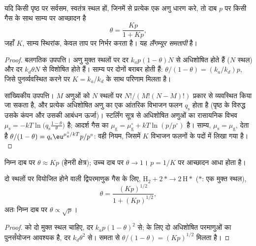 \begin{theorem}[लैंगम्यूर समतापी]\label{thm:b3:surfaces-catalysis:langmuir}
यदि किसी पृष्ठ पर सर्वसम, स्वतंत्र स्थल हों, जिनमें से प्रत्येक एक अणु धारण करे, तो
दाब $p$ पर किसी गैस के साथ साम्य पर आच्छादन है
\[
  \theta = \frac{Kp}{1 + Kp},
\]
जहाँ $K$,  साम्य स्थिरांक, केवल
ताप पर निर्भर करता है। यह \emph{लैंगम्यूर समतापी} है।
\end{theorem}

\begin{proof}
बलगतिक उपपत्ति। अणु मुक्त स्थलों पर दर $k_ap(1 - \theta)N$ से अधिशोषित होते हैं ($N$
स्थल) और दर $k_d\theta N$ से विशोषित होते हैं। साम्य पर दोनों बराबर होती हैं: $\theta/(1 - \theta)
= (k_a/k_d)p$, जिसे पुनर्व्यवस्थित करने पर $K = k_a/k_d$ के साथ परिणाम मिलता है।

सांख्यिकीय उपपत्ति। $M$ अणुओं को $N$ स्थलों पर $N!/(M!(N - M)!)$ प्रकार से व्यवस्थित किया जा सकता है,
और प्रत्येक अधिशोषित अणु का एक आंतरिक विभाजन फलन $q_{\mathrm s}$ होता है (पृष्ठ के
विरुद्ध उसके कंपन और उसकी आबंधन ऊर्जा)। स्टर्लिंग सूत्र से
अधिशोषित अणुओं का रासायनिक विभव $\mu_{\mathrm s} = -kT\ln\bigl(q_{\mathrm s}\frac{1 - \theta}{\theta}\bigr)$ है;
आदर्श गैस का $\mu_{\mathrm g} = \mu_{\mathrm g}^\circ + kT\ln(p/p^\circ)$ है। साम्य, $\mu_{\mathrm s} = \mu_{\mathrm g}$, देता है
$\theta/(1 - \theta) = q_{\mathrm s}\eu^{\mu_{\mathrm g}^\circ/kT}p/p^\circ$: वही नियम, जिसमें $K$ विभाजन फलनों के
पदों में लिखा गया है।
\end{proof}

निम्न दाब पर $\theta \approx Kp$ (हेनरी क्षेत्र); उच्च दाब पर $\theta \to 1$।
$p = 1/K$ पर आच्छादन आधा होता है।

\begin{proposition}[वियोजी अधिशोषण]\label{prop:b3:surfaces-catalysis:dissociative}
दो स्थलों पर वियोजित होने वाली द्विपरमाणुक गैस के लिए, $\mathrm{H_2} + 2\,{*} \to 2\,\mathrm{H}{*}$ (${*}$: एक मुक्त स्थल),
\[
  \theta = \frac{(Kp)^{1/2}}{1 + (Kp)^{1/2}},
\]
अतः निम्न दाब पर $\theta \propto \sqrt p$।
\end{proposition}

\begin{proof}
 को दो मुक्त स्थल चाहिए, दर $k_ap(1 - \theta)^2$ से;  के लिए दो
अधिशोषित परमाणुओं का पुनर्संयोजन आवश्यक है, दर $k_d\theta^2$ से। समता से $\theta/(1 - \theta) =
(Kp)^{1/2}$ मिलता है।
\end{proof}

